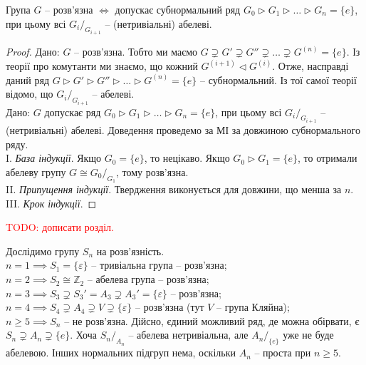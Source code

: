 \documentclass{math_library}
\begin{document}
\begin{proposition}
Група $G$ -- розв'язна $\iff$ допускає субнормальний ряд $G_0 \triangleright G_1 \triangleright \dots \triangleright G_n = \{e\}$, при цьому всі ${G_i}/_{G_{i+1}}$ -- (нетривіальні) абелеві.
\end{proposition}

\begin{proof}
\rightproof Дано: $G$ -- розв'язна. Тобто ми маємо $G \supsetneq G' \supsetneq G'' \supsetneq \dots \supsetneq G^{(n)} = \{e\}$. Із теорії про комутанти ми знаємо, що кожний $G^{(i+1)} \triangleleft G^{(i)}$. Отже, насправді даний ряд $G \triangleright G' \triangleright G'' \triangleright \dots \triangleright G^{(n)} = \{e\}$ -- субнормальний. Із тої самої теорії відомо, що ${G_i}/_{G_{i+1}}$ -- абелеві.
\bigskip \\
\leftproof Дано: $G$ допускає ряд $G_0 \triangleright G_1 \triangleright \dots \triangleright G_n = \{e\}$, при цьому всі ${G_i}/_{G_{i+1}}$ -- (нетривіальні) абелеві. Доведення проведемо за МІ за довжиною субнормального ряду.\\
I. \textit{База індукції}. Якщо $G_0 = \{e\}$, то нецікаво. Якщо $G_0 \triangleright G_1 = \{e\}$, то отримали абелеву групу $G \cong {G_0}/_{G_1}$, тому розв'язна.\\
II. \textit{Припущення індукції}. Твердження виконується для довжини, що менша за $n$.\\
III. \textit{Крок індукції}. 
\end{proof}

\textcolor{red}{TODO: дописати розділ.}

\begin{example}
Дослідимо групу $S_n$ на розв'язність.\\
$n = 1 \implies S_1 = \{\varepsilon\}$ -- тривіальна група -- розв'язна;\\
$n = 2 \implies S_2 \cong \mathbb{Z}_2$ -- абелева група -- розв'язна;\\
$n = 3 \implies S_3 \supsetneq S_3' = A_3 \supsetneq A_3' = \{\varepsilon\}$ -- розв'язна;\\
$n = 4 \implies S_4 \supsetneq A_4 \supsetneq V \supsetneq \{\varepsilon\}$ -- розв'язна (тут $V$ -- група Кляйна);\\
$n \geq 5 \implies S_n$ -- не розв'язна. Дійсно, єдиний можливий ряд, де можна обірвати, є $S_n \supsetneq A_n \supsetneq \{e\}$. Хоча ${S_n}/_{A_n}$ -- абелева нетривіальна, але ${A_n}/_{\{e\}}$ уже не буде абелевою. Інших нормальних підгруп нема, оскільки $A_n$ -- проста при $n \geq 5$.
\end{example}
\end{document}
